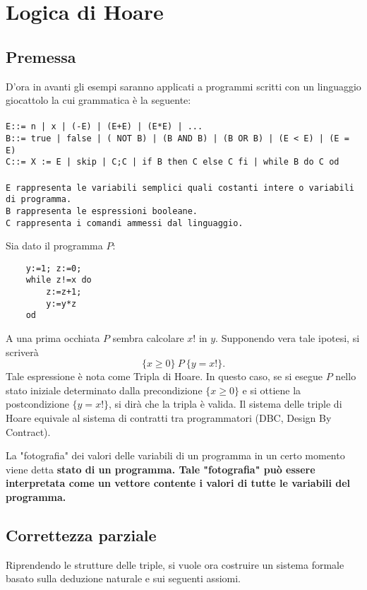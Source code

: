 \chapter{Logica di Hoare}
\label{chap:logicaHoare}
\section{Premessa}
D'ora in avanti gli esempi saranno applicati a programmi scritti con un linguaggio giocattolo la cui grammatica \`e la seguente:\\
\tt 
\\
E::= n | x | (-E) | (E+E) | (E*E) | ... \\ 
B::=  true | false | ( NOT B) | (B AND  B) | (B OR B) | (E < E) | (E = E)\\
C::= X := E | skip | C;C | if B then C else C fi | while B do C od
\rm \\
\\
\tt E \rm rappresenta le variabili semplici quali costanti intere o variabili di programma.\\
\tt B \rm rappresenta le espressioni booleane.\\
\tt C \rm rappresenta i comandi ammessi dal linguaggio.\\

\begin{es}
	Sia dato il programma $P$:
	\begin{lstlisting}
	y:=1; z:=0;
	while z!=x do
		z:=z+1;
		y:=y*z
	od
	\end{lstlisting}
\end{es}
A una prima occhiata $P$ sembra calcolare $x!$ in $y$. Supponendo vera tale ipotesi, si scriver\`a $$\{x \geq 0\}\ P\ \{y = x!\}.$$
Tale espressione \`e nota come Tripla di Hoare. In questo caso, se si esegue $P$ nello stato iniziale determinato dalla precondizione $\{x \geq 0\}$ e si ottiene la postcondizione $\{y = x!\}$, si dir\`a che la tripla \`e valida. Il sistema delle triple di Hoare equivale al sistema di contratti tra programmatori (DBC, Design By Contract).

\begin{deff}
	La "fotografia" dei valori delle variabili di un programma in un certo momento viene detta \bf stato di un programma\rm. Tale "fotografia" pu\`o essere interpretata come un vettore contente i valori di tutte le variabili del programma.
\end{deff}
\newpage
\section{Correttezza parziale}
Riprendendo le strutture delle triple, si vuole ora costruire un sistema formale basato sulla deduzione naturale e sui seguenti assiomi.
